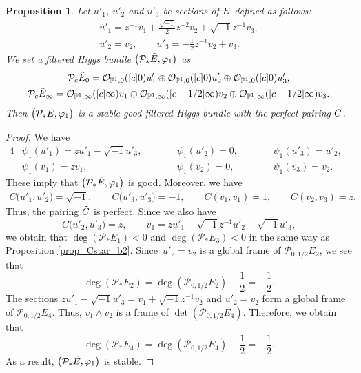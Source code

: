 \documentclass[pdftex]{sigma}
\numberwithin{equation}{section}
\newtheorem{Proposition}[Theorem]{Proposition}
 { \theoremstyle{definition}
\newtheorem{Definition}[Theorem]{Definition}
\newtheorem{Note}[Theorem]{Note}
\newtheorem{Example}[Theorem]{Example}
\newtheorem{Remark}[Theorem]{Remark}

\newtheorem{Question}[Theorem]{Question}
\newtheorem{Assumption}[Theorem]{Assumption}}
\newcommand{\ps}{\mathbb{P}}
\newcommand{\strsheaf}{\mathcal{O}}
\begin{document}
\begin{Proposition}\label{prop_Cstar_b1}
 Let $u'_1$, $u'_2$ and $u'_3$ be sections of $\Tilde{E}$ defined as follows:
 \begin{gather*}
 u'_1 = z^{-1}v_1 + \frac{\sqrt{-1}}{2}z^{-2}v_2 + \sqrt{-1}z^{-1}v_3,\\
 u'_2 = v_2,\qquad u'_3 = -\frac{1}{2} z^{-1}v_2 + v_3.
 \end{gather*}
 We set a filtered Higgs bundle $\bigl(\mathcal{P}_{*}\Tilde{E},\varphi_1\bigr)$ as
 \begin{gather*}
 \mathcal{P}_c \Tilde{E}_{0} = \strsheaf_{\ps^1,0}([c]0)u'_1\oplus \strsheaf_{\ps^1,0}([c]0)u'_2\oplus \strsheaf_{\ps^1,0}([c]0)u'_3,\\
 \mathcal{P}_c \Tilde{E}_{\infty} = \strsheaf_{\ps^1,\infty}([c]\infty)v_1\oplus \strsheaf_{\ps^1,\infty}([c-1/2]\infty)v_2\oplus \strsheaf_{\ps^1,\infty}([c-1/2]\infty)v_3.
 \end{gather*}
 Then $\bigl(\mathcal{P}_{*}\Tilde{E},\varphi_1\bigr)$ is a stable good filtered Higgs bundle with the perfect pairing $\Tilde{C}$.
\end{Proposition}
\begin{proof}
 We have
 \begin{alignat*}{4}
 &\psi_1(u'_1) = zu'_1 - \sqrt{-1}u'_3,\qquad&& \psi_1(u'_2) = 0,\qquad&& \psi_1(u'_3) = u'_2,&\\
 &\psi_1(v_1) = zv_1, \qquad&& \psi_1(v_2) = 0, \qquad&& \psi_1(v_3) = v_2.&
 \end{alignat*}
 These imply that $\bigl(\mathcal{P}_{*}\Tilde{E},\varphi_1\bigr)$ is good. Moreover, we have
 \begin{gather*}
 C\big(u'_1,u'_2\big)=\sqrt{-1},\qquad C\big(u'_3,u'_3\big)=-1,\qquad C(v_1,v_1)=1,\qquad C(v_2,v_3)=z.
 \end{gather*}
 Thus, the pairing $\Tilde{C}$ is perfect. Since we also have
 \begin{equation*}
 C\big(u'_2,u'_3\big)= z, \qquad v_1 = zu'_1 -\sqrt{-1}z^{-1}u'_2 - \sqrt{-1}u'_3,
 \end{equation*}
 we obtain that $\deg(\mathcal{P}_{*}E_1)<0$ and $\deg(\mathcal{P}_{*}E_3)<0$ in the same way as Proposition \ref{prop_Cstar_b2}. Since~${u'_2=v_2}$ is a global frame of $\mathcal{P}_{0,1/2}E_2$, we see that
 \begin{equation*}
 \deg(\mathcal{P}_{*}E_2) = \deg(\mathcal{P}_{0,1/2}E_2) - \frac{1}{2} = -\frac{1}{2}.
 \end{equation*}
 The sections $zu'_1-\sqrt{-1}u'_3=v_1+\sqrt{-1}z^{-1}v_2$ and $u'_2=v_2$ form a global frame of $\mathcal{P}_{0,1/2}E_4$. Thus, $v_1\wedge v_2$ is a frame of $\det(\mathcal{P}_{0,1/2}E_4)$. Therefore, we obtain that
 \begin{equation*}
 \deg(\mathcal{P}_{*}E_4) = \deg(\mathcal{P}_{0,1/2}E_4) - \frac{1}{2} = -\frac{1}{2}.
 \end{equation*}
 As a result, $\bigl(\mathcal{P}_{*}\Tilde{E},\varphi_1\bigr)$ is stable.
\end{proof}
\end{document}
